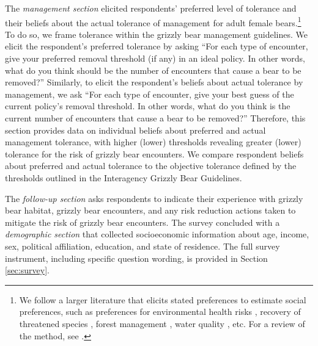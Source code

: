 \documentclass[english,12pt]{article}
\begin{document}
The \textit{management section} elicited respondents’ preferred level of tolerance and their beliefs about the actual tolerance of management for adult female bears.\footnote{We follow a larger literature that elicits stated preferences to estimate social preferences, such as preferences for environmental health risks \citep{adamowicz2014}, recovery of threatened species \citep{boxall_complexity_2009}, forest management \citep{horne_multiple-use_2005}, water quality \citep{bateman2023perspectives}, etc. For a review of the method, see \cite{johnston_contemporary_2017}.} To do so, we frame tolerance within the grizzly bear management guidelines. We elicit the respondent’s preferred tolerance by asking ``For each type of encounter, give your preferred removal threshold (if any) in an ideal policy. In other words, what do you think should be the number of encounters that cause a bear to be removed?'' Similarly, to elicit the respondent’s beliefs about actual tolerance by management, we ask ``For each type of encounter, give your best guess of the current policy’s removal threshold. In other words, what do you think is the current number of encounters that cause a bear to be removed?'' Therefore, this section provides data on individual beliefs about preferred and actual management tolerance, with higher (lower) thresholds revealing greater (lower) tolerance for the risk of grizzly bear encounters. We compare respondent beliefs about preferred and actual tolerance to the objective tolerance defined by the thresholds outlined in the Interagency Grizzly Bear Guidelines. 

The \textit{follow-up section} asks respondents to indicate their experience with grizzly bear habitat, grizzly bear encounters, and any risk reduction actions taken to mitigate the risk of grizzly bear encounters.
The survey concluded with a \textit{demographic section} that collected socioeconomic information about age, income, sex, political affiliation, education, and state of residence. The full survey instrument, including specific question wording, is provided in Section \ref{sec:survey}.
\end{document}

